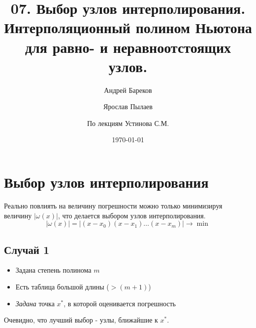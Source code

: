\documentclass[a4paper,11pt]{article}
\title{07. Выбор узлов интерполирования. Интерполяционный полином Ньютона для равно- и неравноотстоящих узлов.}
\author{Андрей Бареков \and Ярослав Пылаев \and По лекциям Устинова С.М.}
\date{\today}
\begin{document}
\maketitle
\newpage

\section{Выбор узлов интерполирования}
Реально повлиять на величину погрешности можно только минимизируя величину $|\omega(x)|$, что делается выбором узлов интерполирования.
\[|\omega(x)| = |(x-x_0)(x-x_1)\dots(x-x_m)| \rightarrow \min\]

  \subsection{Случай 1}
  \begin{itemize}
    \item Задана степень полинома $m$
    \item Есть таблица большой длины ($>(m + 1)$)
    \item \textit{Задана} точка $x^*$, в которой оценивается погрешность
  \end{itemize}
  Очевидно, что лучший выбор - узлы, ближайшие к $x^*$.
\end{document}
